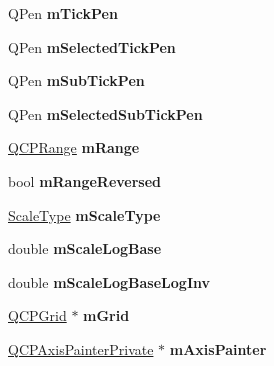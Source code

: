 \begin{DoxyCompactItemize}
\item 
\hypertarget{classQCPAxis_a1d52c78c856d8bd1f331d4ec4e63d944}{}Q\+Pen {\bfseries m\+Tick\+Pen}\label{classQCPAxis_a1d52c78c856d8bd1f331d4ec4e63d944}

\item 
\hypertarget{classQCPAxis_a9524593dbc75a5c5b29dbd1cb4b37df5}{}Q\+Pen {\bfseries m\+Selected\+Tick\+Pen}\label{classQCPAxis_a9524593dbc75a5c5b29dbd1cb4b37df5}

\item 
\hypertarget{classQCPAxis_a32ef56d3a417866720eb12667d27dbd1}{}Q\+Pen {\bfseries m\+Sub\+Tick\+Pen}\label{classQCPAxis_a32ef56d3a417866720eb12667d27dbd1}

\item 
\hypertarget{classQCPAxis_aa5cc6afc5dc2a365f5abbd36eb04a1dc}{}Q\+Pen {\bfseries m\+Selected\+Sub\+Tick\+Pen}\label{classQCPAxis_aa5cc6afc5dc2a365f5abbd36eb04a1dc}

\item 
\hypertarget{classQCPAxis_a1ee36773c49062d751560e11f90845f7}{}\hyperlink{classQCPRange}{Q\+C\+P\+Range} {\bfseries m\+Range}\label{classQCPAxis_a1ee36773c49062d751560e11f90845f7}

\item 
\hypertarget{classQCPAxis_a5cb034f57aa3d773a9ca55a0931dbf7b}{}bool {\bfseries m\+Range\+Reversed}\label{classQCPAxis_a5cb034f57aa3d773a9ca55a0931dbf7b}

\item 
\hypertarget{classQCPAxis_ad706039549cbbbec5fcb2baf7894e04d}{}\hyperlink{classQCPAxis_a36d8e8658dbaa179bf2aeb973db2d6f0}{Scale\+Type} {\bfseries m\+Scale\+Type}\label{classQCPAxis_ad706039549cbbbec5fcb2baf7894e04d}

\item 
\hypertarget{classQCPAxis_abc727ddb4af745151755d1b5e60d03c3}{}double {\bfseries m\+Scale\+Log\+Base}\label{classQCPAxis_abc727ddb4af745151755d1b5e60d03c3}

\item 
\hypertarget{classQCPAxis_a93e068984b475467929e7f6768754227}{}double {\bfseries m\+Scale\+Log\+Base\+Log\+Inv}\label{classQCPAxis_a93e068984b475467929e7f6768754227}

\item 
\hypertarget{classQCPAxis_a17bffb94aaa40311f259c6ac7bcb5d5f}{}\hyperlink{classQCPGrid}{Q\+C\+P\+Grid} $\ast$ {\bfseries m\+Grid}\label{classQCPAxis_a17bffb94aaa40311f259c6ac7bcb5d5f}

\item 
\hypertarget{classQCPAxis_aeeae00935bd2dab82d64f32544a90913}{}\hyperlink{classQCPAxisPainterPrivate}{Q\+C\+P\+Axis\+Painter\+Private} $\ast$ {\bfseries m\+Axis\+Painter}\label{classQCPAxis_aeeae00935bd2dab82d64f32544a90913}


\end{DoxyCompactItemize}
